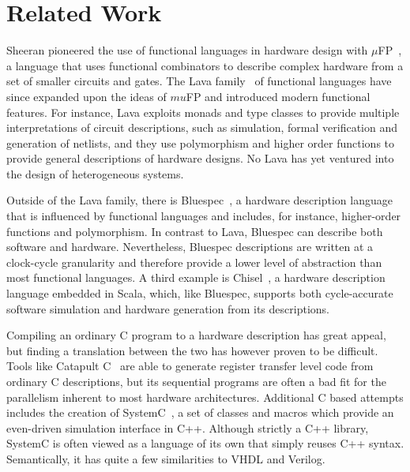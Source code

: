 \documentclass[../paper.tex]{subfiles}
\begin{document}
\section{Related Work}
\label{related}

Sheeran pioneered the use of functional languages in hardware design with $\mu$FP~\cite{sheeran1984}, a language that uses functional combinators to describe complex hardware from a set of smaller circuits and gates. The Lava family~\cite{bjesse1998, gill2010, york-lava} of functional languages have since expanded upon the ideas of $mu$FP and introduced modern functional features. For instance, Lava exploits monads and type classes to provide multiple interpretations of circuit descriptions, such as simulation, formal verification and generation of netlists, and they use polymorphism and higher order functions to provide general descriptions of hardware designs. No Lava has yet ventured into the design of heterogeneous systems.

Outside of the Lava family, there is Bluespec~\cite{nikhil2004}, a hardware description language that is influenced by functional languages and includes, for instance, higher-order functions and polymorphism. In contrast to Lava, Bluespec can describe both software and hardware. Nevertheless, Bluespec descriptions are written at a clock-cycle granularity and therefore provide a lower level of abstraction than most functional languages. A third example is Chisel~\cite{bachrach2012}, a hardware description language embedded in Scala, which, like Bluespec, supports both cycle-accurate software simulation and hardware generation from its descriptions.

Compiling an ordinary C program to a hardware description has great appeal, but finding a translation between the two has however proven to be difficult. Tools like Catapult C~\cite{graphics2008} are able to generate register transfer level code from ordinary C descriptions, but its sequential programs are often a bad fit for the parallelism inherent to most hardware architectures. Additional C based attempts includes the creation of SystemC~\cite{ghenassia2005}, a set of classes and macros which provide an even-driven simulation interface in C++. Although strictly a C++ library, SystemC is often viewed as a language of its own that simply reuses C++ syntax. Semantically, it has quite a few similarities to VHDL and Verilog.
\end{document}
